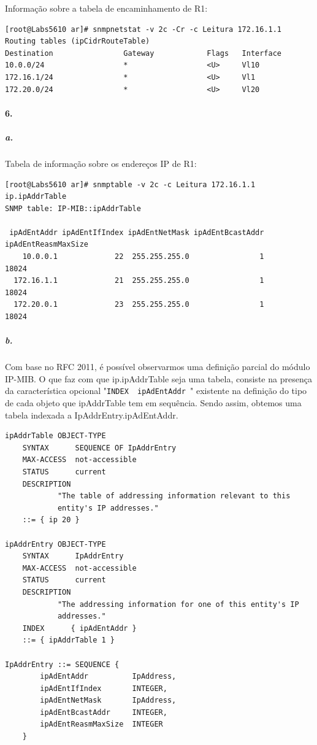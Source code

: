 \newpage

Informação sobre a tabela de encaminhamento de \textsf{R1}:
\begin{verbatim}
[root@Labs5610 ar]# snmpnetstat -v 2c -Cr -c Leitura 172.16.1.1
Routing tables (ipCidrRouteTable)
Destination                Gateway            Flags   Interface
10.0.0/24                  *                  <U>     Vl10
172.16.1/24                *                  <U>     Vl1
172.20.0/24                *                  <U>     Vl20
\end{verbatim}


\paragraph{6.}

\subparagraph{a.}
Tabela de informação sobre os endereços IP de \textsf{R1}:
\begin{verbatim}
[root@Labs5610 ar]# snmptable -v 2c -c Leitura 172.16.1.1 ip.ipAddrTable
SNMP table: IP-MIB::ipAddrTable

 ipAdEntAddr ipAdEntIfIndex ipAdEntNetMask ipAdEntBcastAddr ipAdEntReasmMaxSize
    10.0.0.1             22  255.255.255.0                1               18024
  172.16.1.1             21  255.255.255.0                1               18024
  172.20.0.1             23  255.255.255.0                1               18024

\end{verbatim}


\subparagraph{b.}
Com base no RFC 2011, é possível observarmos uma definição parcial do módulo IP-MIB. O que faz com que \textsf{ip.ipAddrTable} seja uma tabela, consiste na presença da característica opcional "\texttt{INDEX { ipAdEntAddr }}" existente na definição do tipo de cada objeto que \textsf{ipAddrTable} tem em sequência. Sendo assim, obtemos uma tabela indexada a \textsf{IpAddrEntry.ipAdEntAddr}.

\begin{verbatim}
ipAddrTable OBJECT-TYPE
    SYNTAX      SEQUENCE OF IpAddrEntry
    MAX-ACCESS  not-accessible
    STATUS      current
    DESCRIPTION
            "The table of addressing information relevant to this
            entity's IP addresses."
    ::= { ip 20 }

ipAddrEntry OBJECT-TYPE
    SYNTAX      IpAddrEntry
    MAX-ACCESS  not-accessible
    STATUS      current
    DESCRIPTION
            "The addressing information for one of this entity's IP
            addresses."
    INDEX      { ipAdEntAddr }
    ::= { ipAddrTable 1 }

IpAddrEntry ::= SEQUENCE {
        ipAdEntAddr          IpAddress,
        ipAdEntIfIndex       INTEGER,
        ipAdEntNetMask       IpAddress,
        ipAdEntBcastAddr     INTEGER,
        ipAdEntReasmMaxSize  INTEGER
    }    
\end{verbatim}


